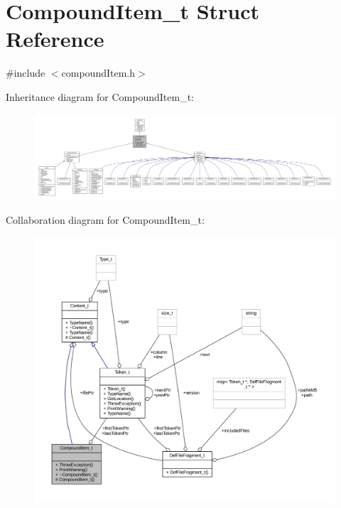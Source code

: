\hypertarget{struct_compound_item__t}{}\section{Compound\+Item\+\_\+t Struct Reference}
\label{struct_compound_item__t}


{\ttfamily \#include $<$compound\+Item.\+h$>$}



Inheritance diagram for Compound\+Item\+\_\+t\+:
\nopagebreak
\begin{figure}[H]
\begin{center}
\leavevmode
\includegraphics[width=350pt]{struct_compound_item__t__inherit__graph}
\end{center}
\end{figure}


Collaboration diagram for Compound\+Item\+\_\+t\+:
\nopagebreak
\begin{figure}[H]
\begin{center}
\leavevmode
\includegraphics[width=350pt]{struct_compound_item__t__coll__graph}
\end{center}
\end{figure}
